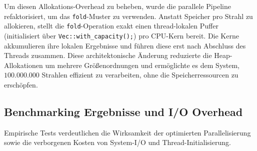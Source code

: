 \documentclass{article}
\begin{document}
    Um diesen Allokations-Overhead zu beheben, wurde die parallele Pipeline refaktorisiert, um das \texttt{fold}-Muster zu verwenden.
    Anstatt Speicher pro Strahl zu allokieren, stellt die \texttt{fold}-Operation exakt einen thread-lokalen Puffer (initialisiert über \texttt{Vec::with\_capacity();}) pro CPU-Kern bereit.
    Die Kerne akkumulieren ihre lokalen Ergebnisse und führen diese erst nach Abschluss des Threads zusammen.
    Diese architektonische Änderung reduzierte die Heap-Allokationen um mehrere Größenordnungen und ermöglichte es dem System, $100.000.000$ Strahlen effizient zu verarbeiten,
    ohne die Speicherressourcen zu erschöpfen.

    \subsection{Benchmarking Ergebnisse und I/O Overhead}
    \label{sec:benchmarks}

    Empirische Tests verdeutlichen die Wirksamkeit der optimierten Parallelisierung sowie die verborgenen Kosten von System-I/O und Thread-Initialisierung.
\end{document}
